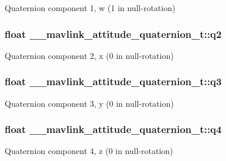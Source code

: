 Quaternion component 1, w (1 in null-\/rotation) 

\hypertarget{struct____mavlink__attitude__quaternion__t_ad6451d99fa8f80bba96a47b3c2408255}{
\subsubsection[{q2}]{\setlength{\rightskip}{0pt plus 5cm}float \+\_\+\+\_\+mavlink\+\_\+attitude\+\_\+quaternion\+\_\+t\+::q2}}\label{struct____mavlink__attitude__quaternion__t_ad6451d99fa8f80bba96a47b3c2408255}


Quaternion component 2, x (0 in null-\/rotation) 

\hypertarget{struct____mavlink__attitude__quaternion__t_a6ea5423090526626cf04041c929703d5}{
\subsubsection[{q3}]{\setlength{\rightskip}{0pt plus 5cm}float \+\_\+\+\_\+mavlink\+\_\+attitude\+\_\+quaternion\+\_\+t\+::q3}}\label{struct____mavlink__attitude__quaternion__t_a6ea5423090526626cf04041c929703d5}


Quaternion component 3, y (0 in null-\/rotation) 

\hypertarget{struct____mavlink__attitude__quaternion__t_a4c78a9e744406f980fab7ff67613b14d}{
\subsubsection[{q4}]{\setlength{\rightskip}{0pt plus 5cm}float \+\_\+\+\_\+mavlink\+\_\+attitude\+\_\+quaternion\+\_\+t\+::q4}}\label{struct____mavlink__attitude__quaternion__t_a4c78a9e744406f980fab7ff67613b14d}


Quaternion component 4, z (0 in null-\/rotation) 

